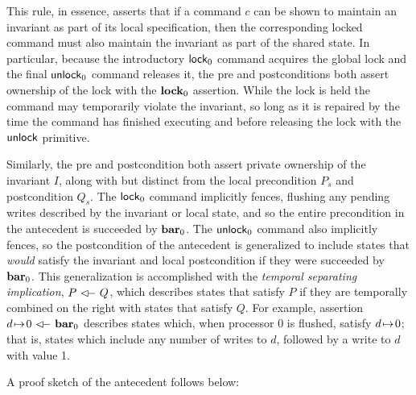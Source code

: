 \documentclass[11pt]{report}
\begin{document}
This rule, in essence, asserts that if a command $c$ can be shown to maintain an invariant as part of its local specification, then the corresponding locked command must also maintain the invariant as part of the shared state. In particular, because the introductory $\operatorname{\mathsf{lock}}_0$ command acquires the global lock and the final $\operatorname{\mathsf{unlock}}_0$ command releases it, the pre and postconditions both assert ownership of the lock with the $\mathbf{lock}_{0}$ assertion. While the lock is held the command may temporarily violate the invariant, so long as it is repaired by the time the command has finished executing and before releasing the lock with the $\operatorname{\mathsf{unlock}}$ primitive. 

Similarly, the pre and postcondition both assert private ownership of the invariant $I$, along with but distinct from the local precondition $P_s$ and postcondition $Q_s$. The $\operatorname{\mathsf{lock}}_0$ command implicitly fences, flushing any pending writes described by the invariant or local state, and so the entire precondition in the antecedent is succeeded by $\mathbf{bar}_{0}$. The $\operatorname{\mathsf{unlock}}_0$ command also implicitly fences, so the postcondition of the antecedent is generalized to include states that \emph{would} satisfy the invariant and local postcondition if they were succeeded by $\mathbf{bar}_{0}$. This generalization is accomplished with the \emph{temporal separating implication}, $P \fseqri Q$, which describes states that satisfy $P$ if they are temporally combined on the right with states that satisfy $Q$. For example, assertion $d \fpointsto 0 \fseqri \fbar{0}$ describes states which, when processor 0 is flushed, satisfy $d \!\mapsto\! 0$; that is, states which include any number of writes to $d$, followed by a write to $d$ with value 1. 

A proof sketch of the antecedent follows below: 
\end{document}
